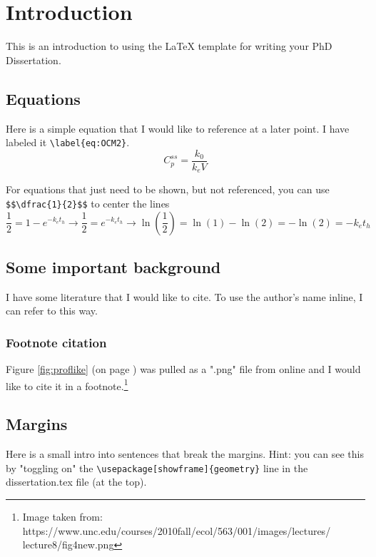 \chapter{Introduction}
\label{introduction}

This is an introduction to using the \LaTeX \xspace template for writing your PhD Dissertation.

\section{Equations}

Here is a simple equation that I would like to reference at a later point. I have labeled it \verb+\label{eq:OCM2}+.
\begin{equation} \label{eq:OCM2}
C_{p}^{ss}=\dfrac{k_0}{k_{e}V}
\end{equation}

For equations that just need to be shown, but not referenced, you can use \verb+$$\dfrac{1}{2}$$+ to center the lines
$$\dfrac{1}{2}=1-e^{-k_{e}t_{h}}\longrightarrow\frac{1}{2}=e^{-k_{e}t_{h}}\longrightarrow\ln⁡{(\dfrac{1}{2})}=\ln{(1)}-\ln{(2)}=-\ln{(2)}=-k_{e}t_{h}$$

\section{Some important background}
I have some literature that I would like to cite.\citep{Cole2014,Venzon1988,Murphy2000,Sprott2000} To use the author's name inline, I can refer to \citet{Cox1992} this way. 

\subsection{Footnote citation}
Figure \ref{fig:proflike} (on page \pageref{fig:proflike}) was pulled as a ".png" file from online and I would like to cite it in a footnote.\footnote{Image taken from: https://www.unc.edu/courses/2010fall/ecol/563/001/images/lectures/\\lecture8/fig4new.png}

\section{Margins} \label{ch1:Description}
Here is a small intro into sentences that break the margins. Hint: you can see this by "toggling on" the \verb+\usepackage[showframe]{geometry}+ line in the dissertation.tex file (at the top).

